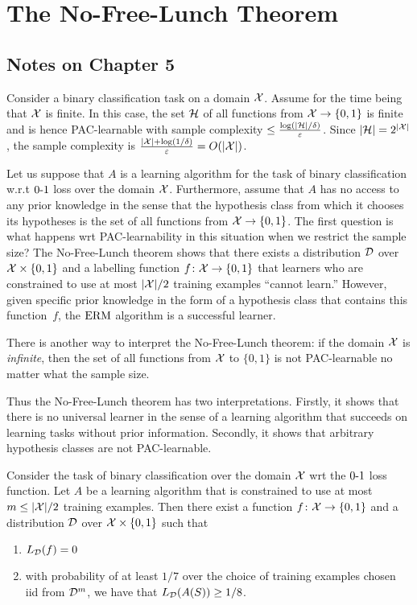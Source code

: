 \chapter{The No-Free-Lunch Theorem}

\section*{Notes on Chapter 5}

Consider a binary classification task on a domain $\mathcal{X}$. Assume for the time
being that $\mathcal{X}$ is finite. In this case, the set $\mathcal{H}$ of all functions
from $\mathcal{X} \rightarrow \{0, 1\}$ is finite and is hence PAC-learnable with
sample complexity $\leq \frac{\log (|\mathcal{H}| / \delta)}{\varepsilon}$.  Since
$|\mathcal{H}| = 2^{|\mathcal{X}|}$, the sample complexity is $\frac{|\mathcal{X}| + \log (1 /
\delta)}{\varepsilon} = O(|\mathcal{X}|)$.

Let us suppose that $A$ is a learning algorithm for the task of binary
classification w.r.t $\operatorname{0-1}$ loss over the domain $\mathcal{X}$. Furthermore, assume
that $A$ has no access to any prior knowledge in the sense that the hypothesis
class from which it chooses its hypotheses is the set of all functions from
$\mathcal{X} \rightarrow \{0, 1\}$.
The first question is what happens wrt PAC-learnability in this situation when
we restrict the sample size? The No-Free-Lunch theorem shows that there exists
a distribution $\mathcal{D}$ over $\mathcal{X} \times \{0, 1\}$ and a labelling function $f
\colon \mathcal{X} \rightarrow \{0, 1\}$ that learners who are  constrained to use at
most $|\mathcal{X}| / 2$ training examples ``cannot learn.'' However, given specific prior
knowledge in the form of a hypothesis class that contains this function~$f$, the
$\operatorname{ERM}$ algorithm is a successful learner.


There is another way to interpret the No-Free-Lunch theorem: if the domain
$\mathcal{X}$ is \emph{infinite}, then the set of all functions from $\mathcal{X}$ to
$\{0, 1\}$ is not PAC-learnable no matter what the sample size.

Thus the No-Free-Lunch theorem has two interpretations. Firstly, it shows that there
is no universal learner in the sense of a learning algorithm that succeeds on
learning tasks without prior information. Secondly, it shows that arbitrary hypothesis
classes are not PAC-learnable.


\begin{theorem}
\label{thm:no_free_lunch}
Consider the task of binary classification over the domain $\mathcal{X}$ wrt the $\operatorname{0-1}$
loss function. Let $A$ be a learning algorithm that is constrained to use at
most $m \leq |\mathcal{X}| / 2$ training examples. Then there exist
a function $f \colon \mathcal{X} \rightarrow \{0, 1\}$ and a distribution
$\mathcal{D}$ over $\mathcal{X} \times \{0, 1\}$ such that
\begin{enumerate}
    \item $L_{\mathcal{D}} (f) = 0$
    \item with probability of at least $1/7$ over the choice of training examples
        chosen iid from $\mathcal{D}^{m}$, we have that $L_{\mathcal{D}} (A(S)) \geq 1/ 8$.
\end{enumerate}
\end{theorem}

